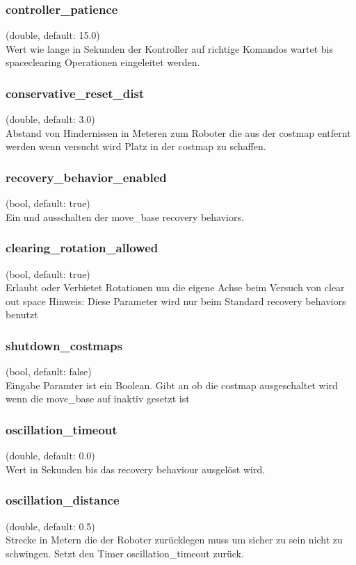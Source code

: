 \documentclass[oribibl]{llncs}
\begin{document}
\subsubsection{controller\_patience} (double, default: 15.0)\\
	Wert wie lange in Sekunden der Kontroller auf richtige Komandos wartet bis spaceclearing Operationen eingeleitet werden.
	
\subsubsection{conservative\_reset\_dist} (double, default: 3.0)\\
	Abstand von Hindernissen in Meteren zum Roboter die aus der costmap entfernt 	werden wenn versucht wird Platz in der costmap zu schaffen.
	
\subsubsection{recovery\_behavior\_enabled} (bool, default: true)\\
	Ein und ausschalten der move\_base recovery behaviors.

\subsubsection{clearing\_rotation\_allowed} (bool, default: true)\\
	Erlaubt oder Verbietet Rotationen um die eigene Achse beim Versuch von clear out 	space
	Hinweis: Diese Parameter wird nur beim Standard recovery behaviors benutzt

\subsubsection{shutdown\_costmaps} (bool, default: false)\\
	Eingabe Paramter ist ein Boolean. Gibt an ob die costmap ausgeschaltet wird wenn 	die move\_base auf inaktiv gesetzt ist
\subsubsection{oscillation\_timeout} (double, default: 0.0)\\
	Wert in Sekunden bis das recovery behaviour ausgelöst wird.
\subsubsection{oscillation\_distance} (double, default: 0.5)\\
	Strecke in Metern die der Roboter zurücklegen muss um sicher zu sein nicht zu 	schwingen. Setzt den Timer oscillation\_timeout zurück.
\end{document}
